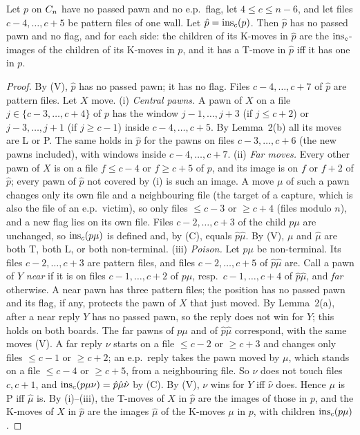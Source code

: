 \begin{wallproof}
\begin{lemma}
Let $p$ on $C_{n}$ have no passed pawn and no e.p.\ flag, let $4\le c\le n-6$, and let files $c-4,\dots,c+5$ be pattern files of one
wall. Let $\hat p=\operatorname{ins}_c(p)$. Then $\hat p$ has no passed pawn and no flag, and for each side: the children of its K-moves in $\hat p$ are
the $\operatorname{ins}_c$-images of the children of its K-moves in $p$, and it has a T-move in $\hat p$ iff it has one in $p$.
\end{lemma}
\begin{proof}
By (V), $\hat p$ has no passed pawn; it has no flag. Files $c-4,\dots,c+7$ of $\hat p$ are pattern files. Let $X$ move.
(i) \emph{Central pawns.} A pawn of $X$ on a file $j\in\{c-3,\dots,c+4\}$ of $p$ has the window $j-1,\dots,j+3$ (if $j\le c+2$) or
$j-3,\dots,j+1$ (if $j\ge c-1$) inside $c-4,\dots,c+5$. By Lemma~2(b) all its moves are L or P. The same holds in $\hat p$ for the pawns on
files $c-3,\dots,c+6$ (the new pawns included), with windows inside $c-4,\dots,c+7$.
(ii) \emph{Far moves.} Every other pawn of $X$ is on a file $f\le c-4$ or $f\ge c+5$ of $p$, and its image is on $f$ or $f+2$ of $\hat p$;
every pawn of $\hat p$ not covered by (i) is such an image. A move $\mu$ of such a pawn changes only its own file and a neighbouring
file (the target of a capture, which is also the file of an e.p.\ victim), so only files $\le c-3$ or $\ge c+4$ (files modulo $n$), and a new
flag lies on its own file. Files $c-2,\dots,c+3$ of the child $p\mu$ are unchanged, so $\operatorname{ins}_c(p\mu)$ is defined and, by (C), equals $\hat p\hat\mu$.
By (V), $\mu$ and $\hat\mu$ are both T, both L, or both non-terminal.
(iii) \emph{Poison.} Let $p\mu$ be non-terminal. Its files $c-2,\dots,c+3$ are pattern files, and files $c-2,\dots,c+5$ of $\hat p\hat\mu$ are.
Call a pawn of $Y$ \emph{near} if it is on files $c-1,\dots,c+2$ of $p\mu$, resp.\ $c-1,\dots,c+4$ of $\hat p\hat\mu$, and \emph{far} otherwise.
A near pawn has three pattern files; the position has no passed pawn and its flag, if any, protects the pawn of $X$ that just moved. By
Lemma~2(a), after a near reply $Y$ has no passed pawn, so the reply does not win for $Y$; this holds on both boards.
The far pawns of $p\mu$ and of $\hat p\hat\mu$ correspond, with the same moves (V). A far reply $\nu$ starts on a file $\le c-2$ or $\ge c+3$
and changes only files $\le c-1$ or $\ge c+2$; an e.p.\ reply takes the pawn moved by $\mu$, which stands on a file $\le c-4$ or
$\ge c+5$, from a neighbouring file. So $\nu$ does not touch files $c,c+1$, and $\operatorname{ins}_c(p\mu\nu)=\hat p\hat\mu\hat\nu$ by (C). By (V),
$\nu$ wins for $Y$ iff $\hat\nu$ does. Hence $\mu$ is P iff $\hat\mu$ is.
By (i)--(iii), the T-moves of $X$ in $\hat p$ are the images of those in $p$, and the K-moves of $X$ in $\hat p$ are the images $\hat\mu$ of
the K-moves $\mu$ in $p$, with children $\operatorname{ins}_c(p\mu)$.
\end{proof}


\end{wallproof}
